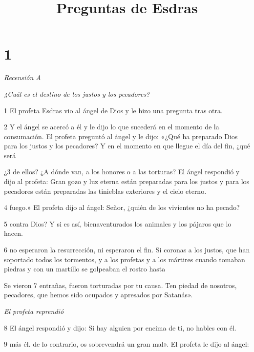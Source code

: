 

\title{Preguntas de Esdras}

\chapter{1}

\par \textit{Recensión A}

\par \textit{¿Cuál es el destino de los justos y los pecadores?}

\par 1 El profeta Esdras vio al ángel de Dios y le hizo una pregunta tras otra.

\par 2 Y el ángel se acercó a él y le dijo lo que sucederá en el momento de la consumación. El profeta preguntó al ángel y le dijo: «¿Qué ha preparado Dios para los justos y los pecadores? Y en el momento en que llegue el día del fin, ¿qué será

¿3 de ellos? ¿A dónde van, a los honores o a las torturas? El ángel respondió y dijo al profeta: Gran gozo y luz eterna están preparadas para los justos y para los pecadores están preparadas las tinieblas exteriores y el cielo eterno.

\par 4 fuego.» El profeta dijo al ángel: Señor, ¿quién de los vivientes no ha pecado?

\par 5 contra Dios? Y si es así, bienaventurados los animales y los pájaros que lo hacen.

\par 6 no esperaron la resurrección, ni esperaron el fin. Si coronas a los justos, que han soportado todos los tormentos, y a los profetas y a los mártires cuando tomaban piedras y con un martillo se golpeaban el rostro hasta

\par Se vieron 7 entrañas, fueron torturadas por tu causa. Ten piedad de nosotros, pecadores, que hemos sido ocupados y apresados ​​por Satanás».

\par \textit{El profeta reprendió}

\par 8 El ángel respondió y dijo: Si hay alguien por encima de ti, no hables con él.

\par 9 más él. de lo contrario, os sobrevendrá un gran mal». El profeta le dijo al ángel:

